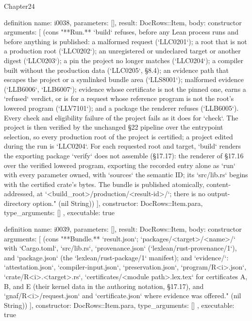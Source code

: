 \begin{lexlean}{Chapter24}
\begin{semanticmodule}
definition{
  name: i0038,
  parameters: [],
  result: DocRows::Item,
  body: constructor{
    arguments: [
      (cons "**Run.** `build` refuses, before any Lean process runs and before anything is published: a malformed request (`LLC0201`); a root that is not a production root (`LLC0202`); an unregistered or undeclared target or another digest (`LLC0203`); a pin the project no longer matches (`LLC0204`); a compiler built without the production data (`LLC0205`, §8.4); an evidence path that escapes the project or a symlinked bundle area (`LLS8001`); malformed evidence (`LLB6006`, `LLB6007`); evidence whose certificate is not the pinned one, earns a `refused` verdict, or is for a request whose reference program is not the root's lowered program (`LLV7101`); and a package the renderer refuses (`LLB6005`). Every check and eligibility failure of the project fails as it does for `check`. The project is then verified by the unchanged §22 pipeline over the entrypoint selection, so every production root of the project is certified; a project edited during the run is `LLC0204`. For each requested root and target, `build` renders the exporting package `verify` does not assemble (§17.17): the renderer of §17.16 over the verified lowered program, exporting the recorded entry alone as `run` with every parameter owned, with `sources` the semantic ID; its `src/lib.rs` begins with the certified crate's bytes. The bundle is published atomically, content-addressed, at `<build_root>/production/<result-id>/`; there is no output-directory option." (nil String))
    ],
    constructor: DocRows::Item.para,
    type_arguments: []
  },
  executable: true
}

definition{
  name: i0039,
  parameters: [],
  result: DocRows::Item,
  body: constructor{
    arguments: [
      (cons "**Bundle.** `result.json`; `packages/<target>/<name>/` with `Cargo.toml`, `src/lib.rs`, `provenance.json` (`lexlean/rust-provenance/1`), and `package.json` (the `lexlean/rust-package/1` manifest); and `evidence/`: `attestation.json`, `compiler-input.json`, `preservation.json`, `program/R<i>.json`, `crate/R<i>.<target>.rs`, `certificates/<module path>.lex.tex` for certificates A, B, and E (their kernel data in the authoring notation, §17.17), and `gnaf/R<i>/request.json` and `certificate.json` where evidence was offered." (nil String))
    ],
    constructor: DocRows::Item.para,
    type_arguments: []
  },
  executable: true
}


\end{semanticmodule}
\end{lexlean}
